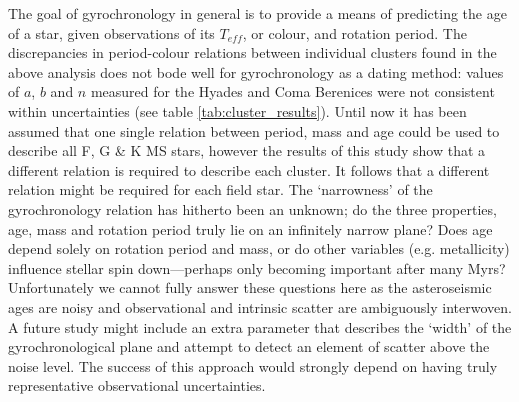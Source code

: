 \documentclass[10pt,preprint]{aastex}
\newcommand{\teff}{$T_{eff}$}
\begin{document}

The goal of gyrochronology in general is to provide a means of predicting the age of a star, given observations of its \teff, or colour, and rotation period.
The discrepancies in period-colour relations between individual clusters found in the above analysis does not bode well for gyrochronology as a dating method: values of $a$, $b$ and $n$ measured for the Hyades and Coma Berenices were not consistent within uncertainties (see table \ref{tab:cluster_results}).
Until now it has been assumed that one single relation between period, mass and age could be used to describe all F, G \& K MS stars, however the results of this study show that a different relation is required to describe each cluster.
It follows that a different relation might be required for each field star.
The `narrowness' of the gyrochronology relation has hitherto been an unknown; do the three properties, age, mass and rotation period truly lie on an infinitely narrow plane?
Does age depend solely on rotation period and mass, or do other variables (e.g. metallicity) influence stellar spin down---perhaps only becoming important after many Myrs?
Unfortunately we cannot fully answer these questions here as the asteroseismic ages are noisy and observational and intrinsic scatter are ambiguously interwoven.
A future study might include an extra parameter that describes the `width' of the gyrochronological plane and attempt to detect an element of scatter above the noise level.
The success of this approach would strongly depend on having truly representative observational uncertainties.
\end{document}
